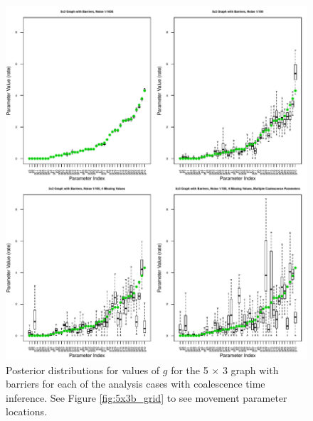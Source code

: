 \documentclass{article}
\newcommand{\plr}[1]{{\em \color{blue} #1}}
\begin{document}
\begin{figure}
\centering
     \includegraphics[scale=0.8]{figs/5x3boxplots}
    \caption{Posterior distributions for values of $g$ 
    for the 5 $\times$ 3 graph with barriers 
    for each of the analysis cases with coalescence time inference.
    See Figure \ref{fig:5x3b_grid} to see movement parameter locations.
}
    \label{fig:5x3boxplots_mult_gam}
\end{figure}
\end{document}
